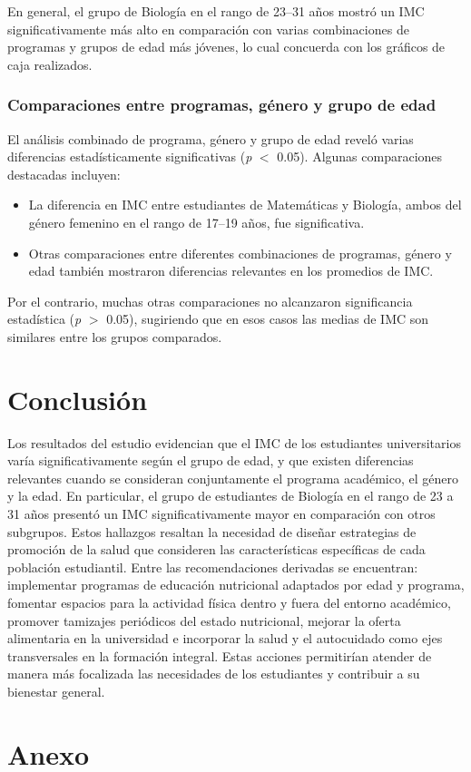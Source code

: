 \documentclass{rapport}
\begin{document}
En general, el grupo de Biología en el rango de 23--31 años mostró un IMC significativamente más alto en comparación con varias combinaciones de programas y grupos de edad más jóvenes, lo cual concuerda con los gráficos de caja realizados.

\subsubsection{Comparaciones entre programas, género y grupo de edad}

El análisis combinado de programa, género y grupo de edad reveló varias diferencias estadísticamente significativas (\textit{p} $<$ 0.05). Algunas comparaciones destacadas incluyen:

\begin{itemize}
    \item La diferencia en IMC entre estudiantes de Matemáticas y Biología, ambos del género femenino en el rango de 17--19 años, fue significativa.
    \item Otras comparaciones entre diferentes combinaciones de programas, género y edad también mostraron diferencias relevantes en los promedios de IMC.
\end{itemize}

Por el contrario, muchas otras comparaciones no alcanzaron significancia estadística (\textit{p} $>$ 0.05), sugiriendo que en esos casos las medias de IMC son similares entre los grupos comparados.
\newpage
\section{Conclusión}

Los resultados del estudio evidencian que el IMC de los estudiantes universitarios varía significativamente según el grupo de edad, y que existen diferencias relevantes cuando se consideran conjuntamente el programa académico, el género y la edad. En particular, el grupo de estudiantes de Biología en el rango de 23 a 31 años presentó un IMC significativamente mayor en comparación con otros subgrupos. Estos hallazgos resaltan la necesidad de diseñar estrategias de promoción de la salud que consideren las características específicas de cada población estudiantil. Entre las recomendaciones derivadas se encuentran: implementar programas de educación nutricional adaptados por edad y programa, fomentar espacios para la actividad física dentro y fuera del entorno académico, promover tamizajes periódicos del estado nutricional, mejorar la oferta alimentaria en la universidad e incorporar la salud y el autocuidado como ejes transversales en la formación integral. Estas acciones permitirían atender de manera más focalizada las necesidades de los estudiantes y contribuir a su bienestar general.
\newpage
\section*{Anexo}


 \newpage
\printbibliography
\end{document}
